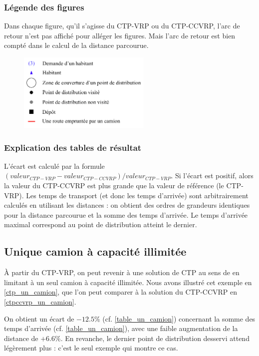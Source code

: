 \documentclass[5p,authoryear]{elsarticle}
\begin{document}
\subsubsection{Légende des figures}
Dans chaque figure, qu'il s'agisse du CTP-VRP ou du CTP-CCVRP, l'arc de retour n'est pas affiché pour alléger les figures. Mais l'arc de retour est bien compté dans le calcul de la distance parcourue. 
\begin{figure}[ht]
	\includegraphics[width=2.5in]{figures/legende}
\end{figure}
\subsubsection{Explication des tables de résultat}
L'écart est calculé par la formule $(valeur_{CTP-VRP}-valeur_{CTP-CCVRP}) / valeur_{CTP-VRP}$. Si l'écart est positif, alors la valeur du CTP-CCVRP est plus grande que la valeur de référence (le CTP-VRP).
Les temps de transport (et donc les temps d'arrivée) sont arbitrairement calculés en utilisant les distances : on obtient des ordres de grandeurs identiques pour la distance parcourue et la somme des temps d'arrivée. Le temps d'arrivée maximal correspond au point de distribution atteint le dernier.
%
%

\subsection{Unique camion à capacité illimitée}
À partir du CTP-VRP, on peut revenir à une solution de CTP au sens de \citeauthor{gendreau_covering_1997} en limitant à un seul camion à capacité illimitée. Nous avons illustré cet exemple en \cref{ctp_un_camion}, que l'on peut comparer à la solution du CTP-CCVRP en \cref{ctpccvrp_un_camion}.

On obtient un écart de $-12.5\%$ (cf. \cref{table_un_camion}) concernant la somme des temps d'arrivée (cf. \cref{table_un_camion}), avec une faible augmentation de la distance de $+6.6\%$. En revanche, le dernier point de distribution desservi attend légèrement plus : c'est le seul exemple qui montre ce cas.
\end{document}
